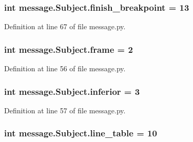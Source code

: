 \subsubsection[{finish\+\_\+breakpoint}]{\setlength{\rightskip}{0pt plus 5cm}int message.\+Subject.\+finish\+\_\+breakpoint = 13\hspace{0.3cm}{\ttfamily [static]}}\label{classmessage_1_1Subject_a3454782f27adb0f5a3a9cb2862b089b8}


Definition at line 67 of file message.\+py.

\hypertarget{classmessage_1_1Subject_a5e06e236446b0943bb19b883d044f9ac}{}
\subsubsection[{frame}]{\setlength{\rightskip}{0pt plus 5cm}int message.\+Subject.\+frame = 2\hspace{0.3cm}{\ttfamily [static]}}\label{classmessage_1_1Subject_a5e06e236446b0943bb19b883d044f9ac}


Definition at line 56 of file message.\+py.

\hypertarget{classmessage_1_1Subject_a366864ab5242b7b1ecf9a161b28b9123}{}
\subsubsection[{inferior}]{\setlength{\rightskip}{0pt plus 5cm}int message.\+Subject.\+inferior = 3\hspace{0.3cm}{\ttfamily [static]}}\label{classmessage_1_1Subject_a366864ab5242b7b1ecf9a161b28b9123}


Definition at line 57 of file message.\+py.

\hypertarget{classmessage_1_1Subject_a6481cfa1d47bc183dbfa9a0391ca1850}{}
\subsubsection[{line\+\_\+table}]{\setlength{\rightskip}{0pt plus 5cm}int message.\+Subject.\+line\+\_\+table = 10\hspace{0.3cm}{\ttfamily [static]}}\label{classmessage_1_1Subject_a6481cfa1d47bc183dbfa9a0391ca1850}


